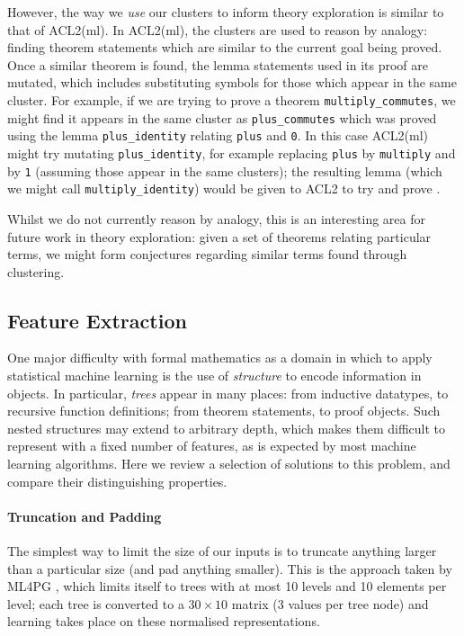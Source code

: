 However, the way we \emph{use} our clusters to inform theory exploration is similar to that of ACL2(ml). In ACL2(ml), the clusters are used to reason by analogy: finding theorem statements which are similar to the current goal being proved. Once a similar theorem is found, the lemma statements used in its proof are mutated, which includes substituting symbols for those which appear in the same cluster. For example, if we are trying to prove a theorem \texttt{multiply_commutes}, we might find it appears in the same cluster as \texttt{plus_commutes} which was proved using the lemma \texttt{plus_identity} relating \texttt{plus} and \texttt{0}. In this case ACL2(ml) might try mutating \texttt{plus_identity}, for example replacing \texttt{plus} by \texttt{multiply} and  by \texttt{1} (assuming those appear in the same clusters); the resulting lemma (which we might call \texttt{multiply_identity}) would be given to ACL2 to try and prove .

Whilst we do not currently reason by analogy, this is an interesting area for future work in theory exploration: given a set of theorems relating particular terms, we might form conjectures regarding similar terms found through clustering.

\subsection{Feature Extraction}

One major difficulty with formal mathematics as a domain in which to apply statistical machine learning is the use of \emph{structure} to encode information in objects. In particular, \emph{trees} appear in many places: from inductive datatypes, to recursive function definitions; from theorem statements, to proof objects. Such nested structures may extend to arbitrary depth, which makes them difficult to represent with a fixed number of features, as is expected by most machine learning algorithms. Here we review a selection of solutions to this problem, and compare their distinguishing properties.

\paragraph{Truncation and Padding}

The simplest way to limit the size of our inputs is to truncate anything larger than a particular size (and pad anything smaller). This is the approach taken by ML4PG \citep{journals/corr/abs-1302-6421}, which limits itself to trees with at most 10 levels and 10 elements per level; each tree is converted to a $30 \times 10$ matrix (3 values per tree node) and learning takes place on these normalised representations.


